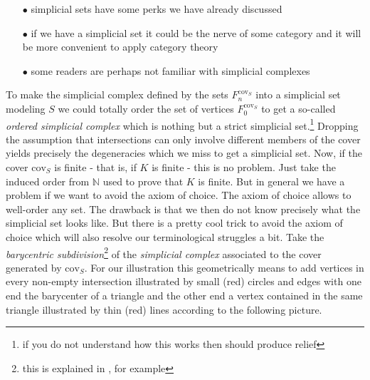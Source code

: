 \begin{enumerate}
\item[$\bullet$]
simplicial sets have some perks we have already discussed
\item[$\bullet$]
if we have a simplicial set it could be the nerve of some category and it will be more convenient to apply category theory
\item[$\bullet$]
some readers are perhaps not familiar with simplicial complexes
\end{enumerate}
To make the simplicial complex defined by the sets $F_{n}^{\mathrm{cov}_{S}}$ into a simplicial set modeling $S$ we could totally order the set of vertices $F_{0}^{\mathrm{cov}_{S}}$ to get a so-called \textit{ordered simplicial complex} which is nothing but a strict simplicial set.\footnote{if you do not understand how this works then \cite{4dd1b85f} should produce relief} Dropping the assumption that intersections can only involve different members of the cover yields precisely the degeneracies which we miss to get a simplicial set. Now, if the cover $\mathrm{cov}_{S}$ is finite - that is, if $K$ is finite - this is no problem. Just take the induced order from $\mathbb{N}$ used to prove that $K$ is finite. But in general we have a problem if we want to avoid the axiom of choice. The axiom of choice allows to well-order any set. The drawback is that we then do not know precisely what the simplicial set looks like. But there is a pretty cool trick to avoid the axiom of choice which will also resolve our terminological struggles a bit. Take the \textit{barycentric subdivision}\footnote{this is explained in \cite{8b5861fc}, for example} of the \textit{simplicial complex} associated to the cover generated by $\mathrm{cov}_{S}$. For our illustration this geometrically means to add vertices in every non-empty intersection illustrated by small (red) circles and edges with one end the barycenter of a triangle and the other end a vertex contained in the same triangle illustrated by thin (red) lines according to the following picture.

